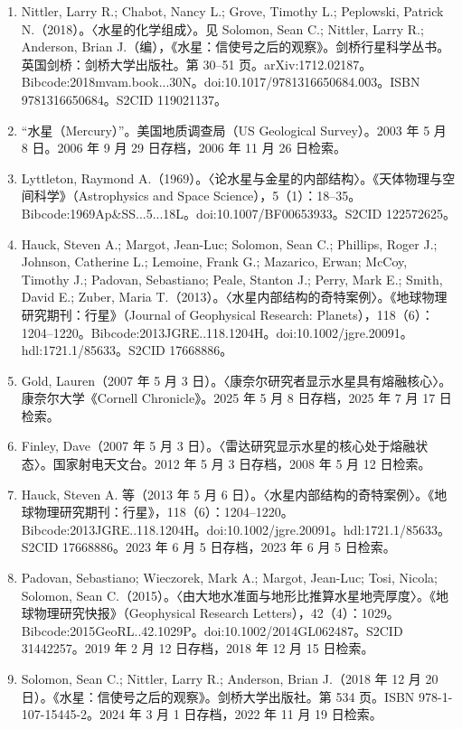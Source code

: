 \begin{enumerate}
    \item Nittler, Larry R.; Chabot, Nancy L.; Grove, Timothy L.; Peplowski, Patrick N.（2018）。〈水星的化学组成〉。见 Solomon, Sean C.; Nittler, Larry R.; Anderson, Brian J.（编），《水星：信使号之后的观察》。剑桥行星科学丛书。英国剑桥：剑桥大学出版社。第 30–51 页。arXiv:1712.02187。Bibcode:2018mvam.book...30N。doi:10.1017/9781316650684.003。ISBN 9781316650684。S2CID 119021137。
    \item “水星（Mercury）”。美国地质调查局（US Geological Survey）。2003 年 5 月 8 日。2006 年 9 月 29 日存档，2006 年 11 月 26 日检索。
    \item Lyttleton, Raymond A.（1969）。〈论水星与金星的内部结构〉。《天体物理与空间科学》（Astrophysics and Space Science），5（1）：18–35。Bibcode:1969Ap&SS...5...18L。doi:10.1007/BF00653933。S2CID 122572625。
    \item Hauck, Steven A.; Margot, Jean-Luc; Solomon, Sean C.; Phillips, Roger J.; Johnson, Catherine L.; Lemoine, Frank G.; Mazarico, Erwan; McCoy, Timothy J.; Padovan, Sebastiano; Peale, Stanton J.; Perry, Mark E.; Smith, David E.; Zuber, Maria T.（2013）。〈水星内部结构的奇特案例〉。《地球物理研究期刊：行星》（Journal of Geophysical Research: Planets），118（6）：1204–1220。Bibcode:2013JGRE..118.1204H。doi:10.1002/jgre.20091。hdl:1721.1/85633。S2CID 17668886。
    \item Gold, Lauren（2007 年 5 月 3 日）。〈康奈尔研究者显示水星具有熔融核心〉。康奈尔大学《Cornell Chronicle》。2025 年 5 月 8 日存档，2025 年 7 月 17 日检索。
    \item Finley, Dave（2007 年 5 月 3 日）。〈雷达研究显示水星的核心处于熔融状态〉。国家射电天文台。2012 年 5 月 3 日存档，2008 年 5 月 12 日检索。
    \item Hauck, Steven A. 等（2013 年 5 月 6 日）。〈水星内部结构的奇特案例〉。《地球物理研究期刊：行星》，118（6）：1204–1220。Bibcode:2013JGRE..118.1204H。doi:10.1002/jgre.20091。hdl:1721.1/85633。S2CID 17668886。2023 年 6 月 5 日存档，2023 年 6 月 5 日检索。
    \item Padovan, Sebastiano; Wieczorek, Mark A.; Margot, Jean-Luc; Tosi, Nicola; Solomon, Sean C.（2015）。〈由大地水准面与地形比推算水星地壳厚度〉。《地球物理研究快报》（Geophysical Research Letters），42（4）：1029。Bibcode:2015GeoRL..42.1029P。doi:10.1002/2014GL062487。S2CID 31442257。2019 年 2 月 12 日存档，2018 年 12 月 15 日检索。
    \item Solomon, Sean C.; Nittler, Larry R.; Anderson, Brian J.（2018 年 12 月 20 日）。《水星：信使号之后的观察》。剑桥大学出版社。第 534 页。ISBN 978-1-107-15445-2。2024 年 3 月 1 日存档，2022 年 11 月 19 日检索。

\end{enumerate}
